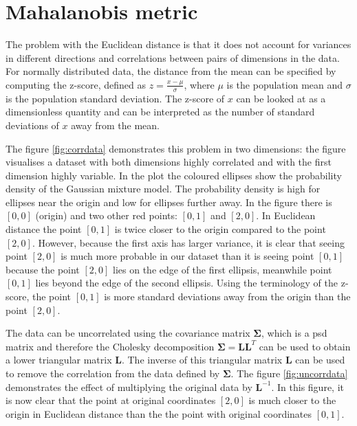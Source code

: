 \documentclass[12pt,a4paper]{report}
\begin{document}

\section{Mahalanobis metric} \label{chap:intro:mah}

The problem with the Euclidean distance is that it does not account for variances in different directions and correlations between pairs of dimensions in the data. For normally distributed data, the distance from the mean can be specified by computing the z-score, defined as $z = \frac{x-\mu}{\sigma}$, where $\mu$ is the population mean and $\sigma$ is the population standard deviation. The z-score of $x$ can be looked at as a dimensionless quantity and can be interpreted as the number of standard deviations of $x$ away from the mean.

The figure \ref{fig:corrdata} demonstrates this problem in two dimensions: the figure visualises a dataset with both dimensions highly correlated and with the first dimension highly variable. In the plot the coloured ellipses show the probability density of the Gaussian mixture model. The probability density is high for ellipses near the origin and low for ellipses further away. In the figure there is $[0,0]$ (origin) and two other red points: $[0,1]$ and $[2,0]$. In Euclidean distance the point $[0,1]$ is twice closer to the origin compared to the point $[2,0]$. However, because the first axis has larger variance, it is clear that seeing point $[2,0]$ is much more probable in our dataset than it is seeing point $[0,1]$ because the point $[2,0]$ lies on the edge of the first ellipsis, meanwhile point $[0,1]$ lies beyond the edge of the second ellipsis. Using the terminology of the z-score, the point $[0,1]$ is more standard deviations away from the origin than the point $[2,0]$.


The data can be uncorrelated using the covariance matrix $\bm{\Sigma}$, which is a \ac{psd} matrix and therefore the Cholesky decomposition $\bm{\Sigma}=\bm{L}\bm{L}^T$ can be used to obtain a lower triangular matrix $\bm{L}$. The inverse of this triangular matrix $\bm{L}$ can be used to remove the correlation from the data defined by $\bm{\Sigma}$. The figure \ref{fig:uncorrdata} demonstrates the effect of multiplying the original data by $\bm{L}^{-1}$. In this figure, it is now clear that the point at original coordinates $[2,0]$ is much closer to the origin in Euclidean distance than the the point with original coordinates $[0,1]$.
\end{document}
